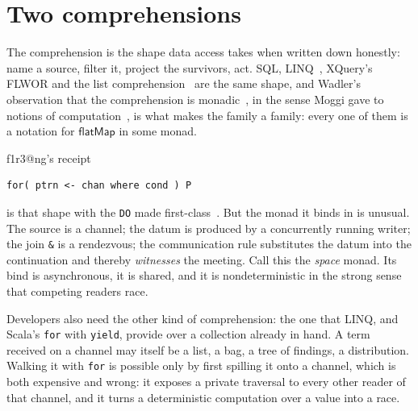 \documentclass[11pt]{article}
\makeatletter
\theoremstyle{definition}
\theoremstyle{plain}
\theoremstyle{remark}
\newcommand{\rhoc}{\textsf{rho}}
\newcommand{\bind}{\mathsf{flatMap}}
\newcommand{\fe}{\texttt{foreach}}
\newcommand{\flang}{\textsf{f1r3\textbar @ng}}
\makeatother
\begin{document}
\begin{abstract}
A worked example declares the parametric \rhoc{} calculus --- the syntax of
the calculus as a type constructor in its data and its variables --- as a
syntax monad whose bind is semantic substitution, with the group action of
oriented processes as a distributive law and with symmetry reducing the
precharge of a comprehension over a symmetric template.

\fe{} is a conservative extension of the core, so it need not be implemented by
translation into \texttt{for}. The translation is retained as the reference
semantics, and a native implementation is correct when it is \emph{gradedly}
bisimilar to it --- the same behaviour and the same bill.
\end{abstract}

\tableofcontents

\section{Two comprehensions}
\label{sec:intro}

The comprehension is the shape data access takes when written down
honestly: name a source, filter it, project the survivors, act. SQL,
LINQ~\cite{LINQ}, XQuery's FLWOR and the list comprehension~\cite{Wadler87}
are the same shape, and Wadler's observation that the comprehension is
monadic~\cite{Wadler92}, in the sense Moggi gave to notions of
computation~\cite{Moggi91}, is what makes the family a family: every one of them
is a notation for \(\bind\) in some monad.

\flang{}'s receipt
\begin{lstlisting}
for( ptrn <- chan where cond ) P
\end{lstlisting}
is that shape with the \texttt{DO} made first-class~\cite{F1R3Dev}. But the
monad it binds in is unusual. The source is a channel; the datum is produced by
a concurrently running writer; the join \texttt{\&} is a rendezvous; the
communication rule substitutes the datum into the continuation and thereby
\emph{witnesses} the meeting. Call this the \emph{space} monad. Its bind is
asynchronous, it is shared, and it is nondeterministic in the strong sense that
competing readers race.

Developers also need the other kind of comprehension: the one that LINQ, and
Scala's \texttt{for} with \texttt{yield}, provide over a collection already in hand. A
term received on a channel may itself be a list, a bag, a tree of findings, a
distribution. Walking it with \texttt{for} is possible only by first spilling
it onto a channel, which is both expensive and wrong: it exposes a private
traversal to every other reader of that channel, and it turns a deterministic
computation over a value into a race.
\end{document}
